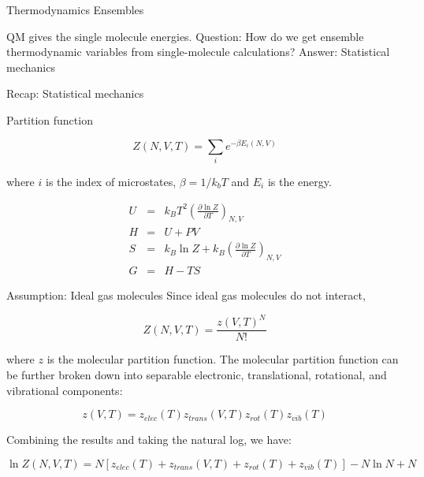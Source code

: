 \documentclass[aspectratio=169]{beamer}
\begin{document}
    \begin{frame}{Thermodynamics Ensembles}

        QM gives the single molecule energies.\newline
        \newline
        Question: How do we get ensemble thermodynamic variables from single-molecule calculations?\newline
        \newline
        Answer: Statistical mechanics

    \end{frame}

    \begin{frame}{Recap: Statistical mechanics}

        Partition function

        \begin{equation*}
            Z(N, V, T) = \sum_{i} e^{-\beta E_i(N,V)}
        \end{equation*}

        where $i$ is the index of microstates, $\beta = 1/k_b T$ and $E_i$ is the energy.

        \begin{eqnarray*}
            U & = & k_B T^2 \left( \frac{\partial \ln Z} {\partial T} \right)_{N,V}\\
            H & = & U + PV\\
            S & = & k_B \ln Z + k_B \left( \frac{\partial \ln Z} {\partial T} \right)_{N,V}\\
            G & = & H - TS
        \end{eqnarray*}
    \end{frame}

    \begin{frame}{Assumption: Ideal gas molecules}
        Since ideal gas molecules do not interact,

        \begin{equation*}
            Z(N, V, T) = \frac{z(V,T)^N}{N!}
        \end{equation*}

        where $z$ is the molecular partition function.\newline
        \newline
        The molecular partition function can be further broken down into separable electronic, translational, rotational, and vibrational components:

        \begin{equation*}
            z(V,T) = z_{elec}(T)z_{trans}(V, T)z_{rot}(T)z_{vib}(T)
        \end{equation*}

        Combining the results and taking the natural log, we have:


        \begin{equation*}
            \ln Z(N, V, T) = N[z_{elec}(T)+z_{trans}(V, T)+z_{rot}(T)+z_{vib}(T)]-N\ln N + N
        \end{equation*}

    \end{frame}
\end{document}
